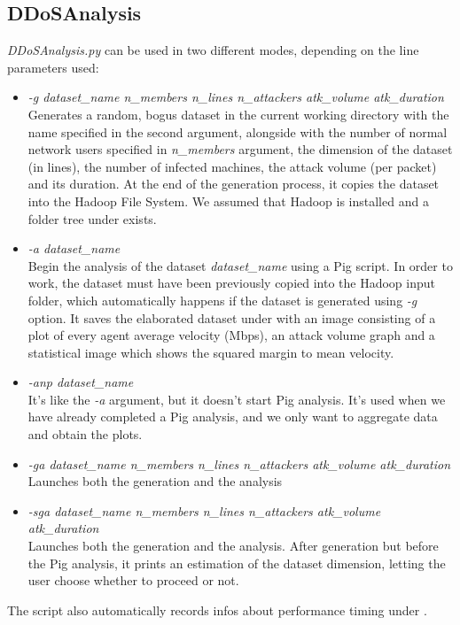 \subsection{DDoSAnalysis}
\textit{DDoSAnalysis.py} can be used in two different modes, depending on the line parameters used: 
	\begin{itemize}
		\item \textit{-g dataset\_name n\_members n\_lines n\_attackers atk\_volume atk\_duration} \\Generates a random, bogus dataset in the current working directory with the name specified in the second argument, alongside with the number of normal network users specified in \textit{n\_members} argument, the dimension of the dataset (in lines), the number of infected machines, the attack volume (per packet) and its duration. At the end of the generation process, it copies the dataset into the Hadoop File System. We assumed that Hadoop is installed and a folder tree under  exists.
		\item \textit{-a dataset\_name} \\ Begin the analysis of the dataset \textit{dataset\_name} using a Pig script. In order to work, the dataset must have been previously copied into the Hadoop input folder, which automatically happens if the dataset is generated using \textit{-g} option. It saves the elaborated dataset under  with an image consisting of a plot of every agent average velocity (Mbps), an attack volume graph and a statistical image which shows the squared margin to mean velocity.
		\item \textit{-anp dataset\_name} \\ It's like the \textit{-a} argument, but it doesn't start Pig analysis. It's used when we have already completed a Pig analysis, and we only want to aggregate data and obtain the plots. 
		\item \textit{-ga dataset\_name n\_members n\_lines n\_attackers atk\_volume atk\_duration} \\ Launches both the generation and the analysis
		\item \textit{-sga dataset\_name n\_members n\_lines n\_attackers atk\_volume atk\_duration} \\ Launches both the generation and the analysis. After generation but before the Pig analysis, it prints an estimation of the dataset dimension, letting the user choose whether to proceed or not.
	\end{itemize}
The script also automatically records infos about performance timing under .

